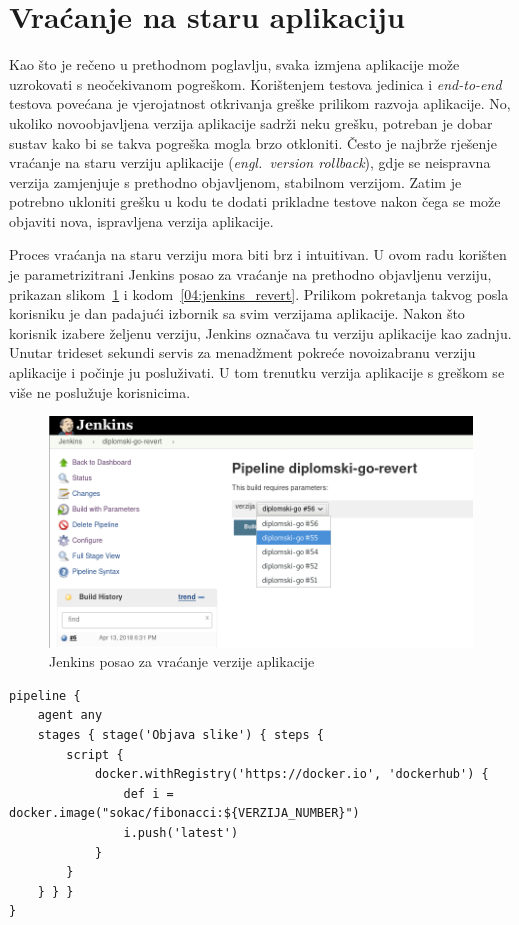 \section{Vraćanje na staru aplikaciju}
Kao što je rečeno u prethodnom poglavlju, svaka izmjena aplikacije može uzrokovati s neočekivanom
pogreškom. Korištenjem testova jedinica i \textit{end-to-end} testova povećana je vjerojatnost
otkrivanja greške prilikom razvoja aplikacije. No, ukoliko novoobjavljena verzija aplikacije sadrži
neku grešku, potreban je dobar sustav kako bi se takva pogreška mogla brzo otkloniti. Često je
najbrže rješenje vraćanje na staru verziju aplikacije (\textit{engl.~version rollback}), gdje se
neispravna verzija zamjenjuje s prethodno objavljenom, stabilnom verzijom. Zatim je potrebno
ukloniti grešku u kodu te dodati prikladne testove nakon čega se može objaviti nova, ispravljena
verzija aplikacije.

Proces vraćanja na staru verziju mora biti brz i intuitivan. U ovom radu korišten je
parametrizitrani Jenkins posao za vraćanje na prethodno objavljenu verziju, prikazan
slikom~\ref{fig:04jenkins_rollback} i kodom~\ref{04:jenkins_revert}. Prilikom pokretanja takvog
posla korisniku je dan padajući izbornik sa svim verzijama aplikacije. Nakon što korisnik izabere
željenu verziju, Jenkins označava tu verziju aplikacije kao zadnju. Unutar trideset sekundi servis
za menadžment pokreće novoizabranu verziju aplikacije i počinje ju posluživati. U tom trenutku
verzija aplikacije s greškom se više ne poslužuje korisnicima.

\begin{figure}[h]
    \centering
    \includegraphics[width=\textwidth]{img/04/jenkins_rollback.png}
    \caption{Jenkins posao za vraćanje verzije aplikacije}%
    \label{fig:04jenkins_rollback}
\end{figure}

\begin{lstlisting}[float=h]
pipeline {
    agent any
    stages { stage('Objava slike') { steps {
        script {
            docker.withRegistry('https://docker.io', 'dockerhub') {
                def i = docker.image("sokac/fibonacci:${VERZIJA_NUMBER}")
                i.push('latest')
            }
        }
    } } }
}
\end{lstlisting}
